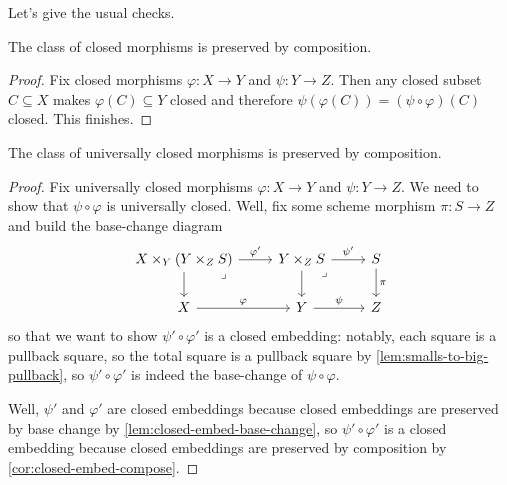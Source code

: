 \documentclass[../notes.tex]{subfiles}
\begin{document}
Let's give the usual checks.
\begin{lemma} \label{lem:closed-morphism-comp}
	The class of closed morphisms is preserved by composition.
\end{lemma}
\begin{proof}
	Fix closed morphisms $\varphi\colon X\to Y$ and $\psi\colon Y\to Z$. Then any closed subset $C\subseteq X$ makes $\varphi(C)\subseteq Y$ closed and therefore $\psi(\varphi(C))=(\psi\circ\varphi)(C)$ closed. This finishes.
\end{proof}
\begin{lemma} \label{lem:univ-closed-comp}
	The class of universally closed morphisms is preserved by composition.
\end{lemma}
\begin{proof}
	Fix universally closed morphisms $\varphi\colon X\to Y$ and $\psi\colon Y\to Z$. We need to show that $\psi\circ\varphi$ is universally closed. Well, fix some scheme morphism $\pi\colon S\to Z$ and build the base-change diagram
	\[\begin{tikzcd}
		{X\times_Y(Y\times_ZS)} & {Y\times_ZS} & S \\
		X & Y & Z
		\arrow["\varphi", from=2-1, to=2-2]
		\arrow["\psi", from=2-2, to=2-3]
		\arrow["\pi", from=1-3, to=2-3]
		\arrow[from=1-1, to=2-1]
		\arrow[from=1-2, to=2-2]
		\arrow["{\varphi'}", from=1-1, to=1-2]
		\arrow["{\psi'}", from=1-2, to=1-3]
		\arrow["\lrcorner"{anchor=center, pos=0.125}, draw=none, from=1-2, to=2-3]
		\arrow["\lrcorner"{anchor=center, pos=0.125}, draw=none, from=1-1, to=2-2]
	\end{tikzcd}\]
	so that we want to show $\psi'\circ\varphi'$ is a closed embedding: notably, each square is a pullback square, so the total square is a pullback square by \autoref{lem:smalls-to-big-pullback}, so $\psi'\circ\varphi'$ is indeed the base-change of $\psi\circ\varphi$.

	Well, $\psi'$ and $\varphi'$ are closed embeddings because closed embeddings are preserved by base change by \autoref{lem:closed-embed-base-change}, so $\psi'\circ\varphi'$ is a closed embedding because closed embeddings are preserved by composition by \autoref{cor:closed-embed-compose}.
\end{proof}
\end{document}
